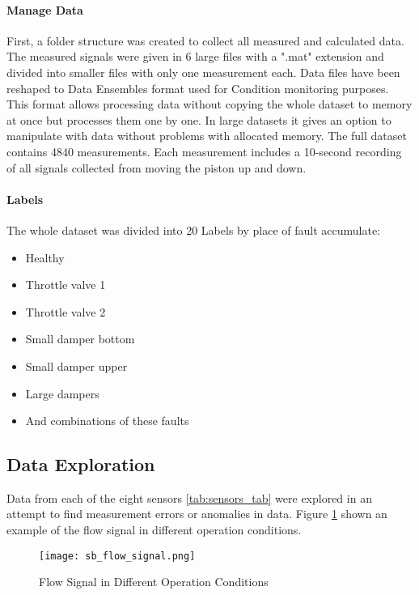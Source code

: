 \paragraph{Manage Data}

First, a folder structure was created to collect all measured and
calculated data. The measured signals were given in 6 large files with a
".mat" extension and divided into smaller files with only one measurement
each.  Data files have been reshaped to Data Ensembles \cite{} format used
for Condition monitoring purposes. This format allows processing data
without copying the whole dataset to memory at once but processes them one
by one. In large datasets it gives an option to manipulate with data
without problems with allocated memory.  The full dataset contains 4840
measurements. Each measurement includes a 10-second recording of all
signals collected from moving the piston up and down.

\paragraph{Labels}
The whole dataset was divided into 20 Labels by place of fault accumulate: 
\begin{itemize}
    \item Healthy
    \item Throttle valve 1
    \item Throttle valve 2 
    \item Small damper bottom
    \item Small damper upper
    \item Large dampers 
    \item And combinations of these faults
\end{itemize}

\subsection{Data Exploration}
Data from each of the eight sensors \ref{tab:sensors_tab} were explored in an attempt to find
measurement errors or anomalies in data.  Figure \ref{fig:flow_sig} shown
an example of the flow signal in different operation conditions. 

\begin{figure}[h!]
    \centering
    \texttt{[image: sb\_flow\_signal.png]}
    \caption{Flow Signal in Different Operation Conditions}
    \label{fig:flow_sig}
\end{figure}


